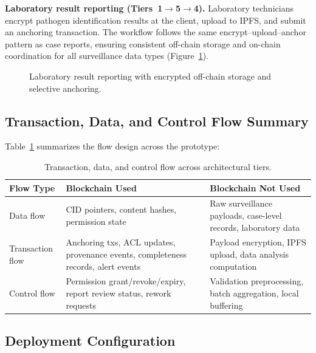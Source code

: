 \textbf{Laboratory result reporting (Tiers~1$\rightarrow$5$\rightarrow$4).} Laboratory technicians encrypt pathogen identification results at the client, upload to IPFS, and submit an anchoring transaction. The workflow follows the same encrypt--upload--anchor pattern as case reports, ensuring consistent off-chain storage and on-chain coordination for all surveillance data types (Figure~\ref{fig:lab}).

\begin{figure}[!ht]
\centering
{}
\caption{Laboratory result reporting with encrypted off-chain storage and selective anchoring.}\label{fig:lab}
\end{figure}

\subsection{Transaction, Data, and Control Flow Summary}\label{subsec:flow_summary}

Table~\ref{tab:flow} summarizes the flow design across the prototype:

\begin{table}[!ht]
\caption{Transaction, data, and control flow across architectural tiers.}\label{tab:flow}
\centering
\small
\begin{tabular}{p{2.2cm}p{2.5cm}p{2.8cm}}
\toprule
\textbf{Flow Type} & \textbf{Blockchain Used} & \textbf{Blockchain Not Used} \\
\midrule
Data flow & CID pointers, content hashes, permission state & Raw surveillance payloads, case-level records, laboratory data \\
\midrule
Transaction flow & Anchoring txs, ACL updates, provenance events, completeness records, alert events & Payload encryption, IPFS upload, data analysis computation \\
\midrule
Control flow & Permission grant/revoke/expiry, report review status, rework requests & Validation preprocessing, batch aggregation, local buffering \\
\bottomrule
\end{tabular}
\end{table}

\subsection{Deployment Configuration}\label{subsec:deployment}

